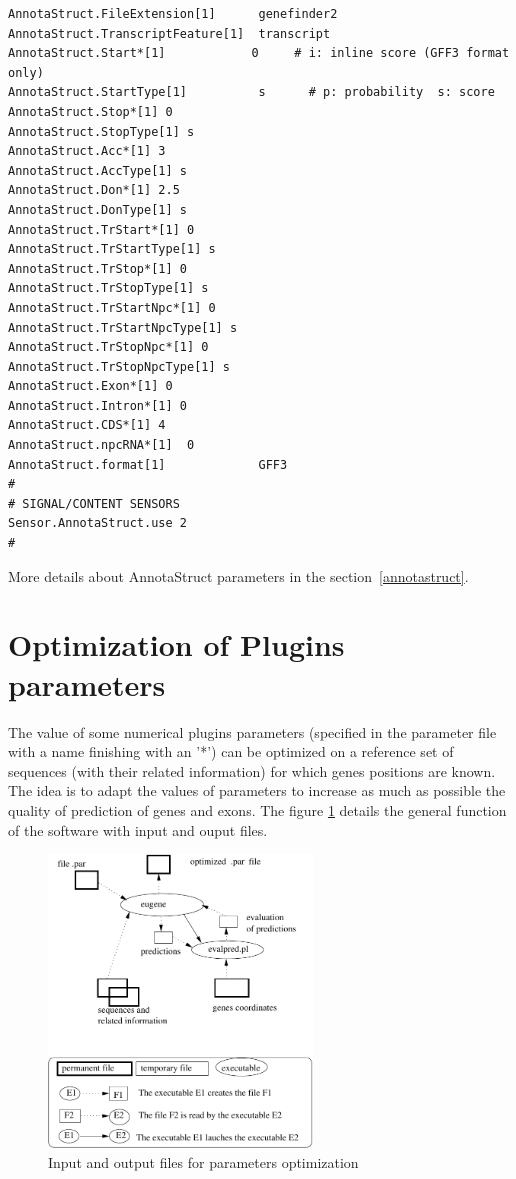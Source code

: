 \documentclass[a4paper,titlepage]{report}
\begin{document}
\begin{Verbatim}[fontsize=\small]
AnnotaStruct.FileExtension[1]      genefinder2
AnnotaStruct.TranscriptFeature[1]  transcript
AnnotaStruct.Start*[1]            0     # i: inline score (GFF3 format only)
AnnotaStruct.StartType[1]          s      # p: probability  s: score
AnnotaStruct.Stop*[1] 0
AnnotaStruct.StopType[1] s
AnnotaStruct.Acc*[1] 3
AnnotaStruct.AccType[1] s
AnnotaStruct.Don*[1] 2.5
AnnotaStruct.DonType[1] s
AnnotaStruct.TrStart*[1] 0
AnnotaStruct.TrStartType[1] s
AnnotaStruct.TrStop*[1] 0
AnnotaStruct.TrStopType[1] s
AnnotaStruct.TrStartNpc*[1] 0
AnnotaStruct.TrStartNpcType[1] s
AnnotaStruct.TrStopNpc*[1] 0
AnnotaStruct.TrStopNpcType[1] s
AnnotaStruct.Exon*[1] 0
AnnotaStruct.Intron*[1] 0
AnnotaStruct.CDS*[1] 4
AnnotaStruct.npcRNA*[1]  0
AnnotaStruct.format[1]             GFF3
#
# SIGNAL/CONTENT SENSORS
Sensor.AnnotaStruct.use 2
#
\end{Verbatim}
More details about AnnotaStruct parameters in the section~\ref{annotastruct}.



\section{Optimization of Plugins parameters}

The value of some numerical plugins parameters (specified in the
parameter file with a name finishing with an '*') can be optimized on
a reference set of sequences (with their related information) for
which genes positions are known. The idea is to adapt the values of
parameters to increase as much as possible the quality of prediction
of genes and exons. The figure \ref{fig:ParaOptimization} details the
general function of the software with input and ouput files.

\begin{figure}[htbp]
  \begin{center}
    \includegraphics[width=7cm]{ParaOptimization}
  \end{center}
  \caption{Input and output files for parameters optimization} 
  \label{fig:ParaOptimization}
\end{figure}
\end{document}
